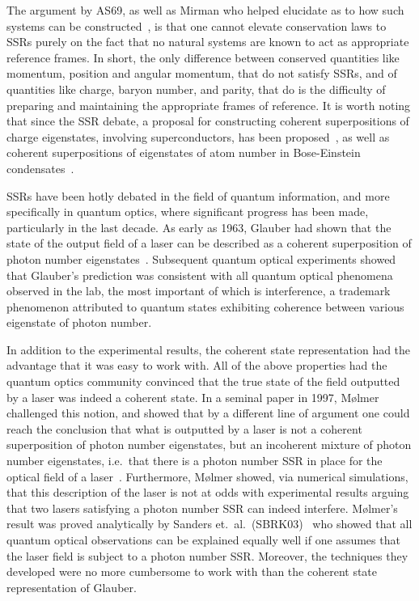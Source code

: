 The argument by AS69, as well as Mirman who helped elucidate as to how such systems can be constructed~\cite{M69, M79}, is that one cannot elevate conservation laws to SSRs purely on the fact that no natural systems are known to act as appropriate reference frames.  In short, the only difference between conserved quantities like momentum, position and angular momentum, that do not satisfy SSRs, and of quantities like charge, baryon number, and parity, that do is the difficulty of preparing and maintaining the appropriate frames of reference.  It is worth noting that since the SSR debate, a proposal for constructing coherent superpositions of charge eigenstates, involving superconductors, has been proposed~\cite{KW74}, as well as coherent superpositions of eigenstates of atom number in Bose-Einstein condensates~\cite{CD97, HY96,JY96,YRJ97,DBRS06, DRP11}.

SSRs have been hotly debated in the field of quantum information, and more specifically in quantum optics, where significant progress has been made, particularly in the last decade. As early as 1963,  Glauber had shown that the state of the output field of a laser can be described as a coherent superposition of photon number eigenstates~\cite{G63}. Subsequent quantum optical experiments showed that Glauber's prediction was consistent with all quantum optical phenomena observed in the lab, the most important of which is interference, a trademark phenomenon attributed to quantum states exhibiting coherence between various eigenstate of photon number.  

In addition to the experimental results, the coherent state representation had the advantage that it was easy to work with.  All of the above properties had the quantum optics community convinced that the true state of the field outputted by a laser was indeed a coherent state.  In a seminal paper in 1997, M{\o}lmer challenged this notion, and showed that by a different line of argument one could reach the conclusion that what is outputted by a laser is not a coherent superposition of photon number eigenstates, but an incoherent mixture of photon number eigenstates, i.e.~that there is a photon number SSR in place for the optical field of a laser~\cite{M97}.  Furthermore, M{\o}lmer showed, via numerical simulations, that this description of the laser is not at odds with experimental results arguing that two lasers satisfying a photon number SSR can indeed interfere. M{\o}lmer's result was proved analytically by Sanders et.~al.~(SBRK03)~\cite{SBRK03} who showed that all quantum optical observations can be explained equally well if one assumes that the laser field is subject to a photon number SSR. Moreover, the techniques they developed were no more cumbersome to work with than the coherent state representation of Glauber. 

